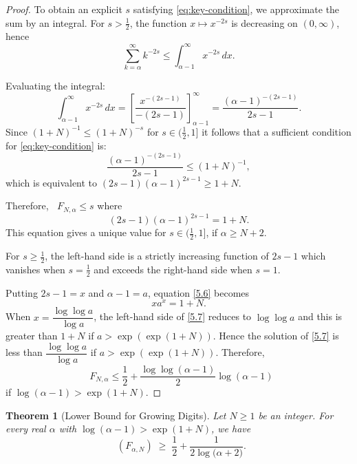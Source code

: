 \documentclass[12pt]{article}
\newtheorem{theorem}{Theorem}[section]
\numberwithin{equation}{section}
\DeclareMathOperator{\dimH}{dim_H}
\begin{document}
\begin{proof}
To obtain an explicit $s$ satisfying \eqref{eq:key-condition}, we approximate the sum by an integral.
For $s > \tfrac12$, the function $x \mapsto x^{-2s}$ is decreasing on $(0,\infty)$, hence
\[
\sum_{k=\alpha}^{\infty} k^{-2s} \leq \int_{\alpha-1}^{\infty} x^{-2s} \, dx.
\]

Evaluating the integral:
\[
\int_{\alpha-1}^{\infty} x^{-2s} \, dx = \left[ \frac{x^{-(2s-1)}}{-(2s-1)} \right]_{\alpha-1}^{\infty} 
= \frac{(\alpha-1)^{-(2s-1)}}{2s-1}.
\]
Since  $(1+N)^{-1} \le (1+N)^{-s}$ for $s \in (\frac{1}{2}, 1]$ it follows that a sufficient condition for \eqref{eq:key-condition} is:
\[
\frac{(\alpha-1)^{-(2s-1)}}{2s-1} \leq (1+N)^{-1},
\]
which is equivalent to 
$(2s-1)(\alpha-1)^{2s-1} \ge 1+N$. 

Therefore, $\dimH F_{N,\alpha} \le s$ where
\begin{equation} \label{5.6}
(2s-1)(\alpha-1)^{2s-1} = 1+N.
\end{equation}
This equation gives a unique value for $s \in (\frac{1}{2}, 1]$, if $\alpha \ge N+2$. 

For $s \ge \frac{1}{2}$, the left-hand side is a strictly increasing function of $2s-1$ which vanishes when $s=\frac{1}{2}$ and exceeds the right-hand side when $s=1$.

Putting $2s-1=x$ and $\alpha -1 =a$, equation \eqref{5.6} becomes 
\begin{equation} \label{5.7}
    x a^x = 1+N.
\end{equation}
When $x = \dfrac{\log\log a}{\log a}$, the left-hand side of \eqref{5.7} reduces to $\log \log a$ and this is greater than $1+N$ if $a > \exp(\exp(1+N))$. 
Hence the solution of \eqref{5.7} is less than $\dfrac{\log\log a}{\log a}$ if $a > \exp(\exp(1+N))$. 
Therefore, 
\[
\dimH F_{N,\alpha} \le \frac{1}{2} + \dfrac{\log\log (\alpha-1)}{2}\log (\alpha-1)
\]
if $\log(\alpha-1) > \exp(1+N)$. 
\end{proof}

\begin{theorem}[Lower Bound for Growing Digits] \label{lowerbound:Good2N}
Let $N \geq 1$ be an integer. For every real $\alpha$ with $\log(\alpha-1) > \exp(1+N)$, we have
\begin{equation}\label{eq:ub-ineq}
\dimH(F_{\alpha,N}) \;\ge \; \frac12 + \frac{1}{2\log\!\bigl({\alpha}+2\bigr)}. 
\end{equation}
\end{theorem}
\end{document}
